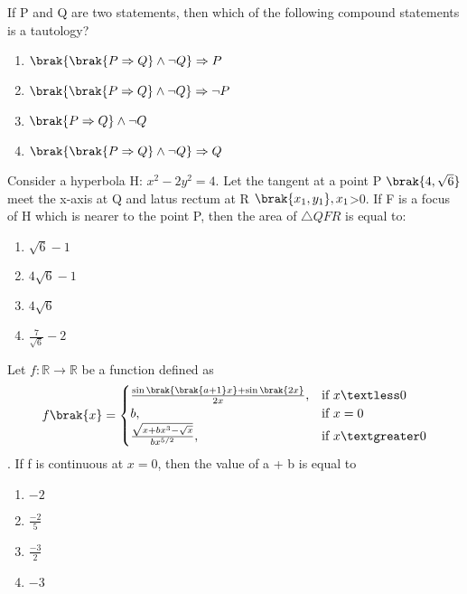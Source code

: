 \iffalse
\title{2021}
\author{AI24BTECH11006}
\section{mcq-single}
\fi
\item If P and Q are two statements, then which of the following compound statements is a tautology?
\hfill{}

	\begin{enumerate}
    
\item  $\brak{\brak{P \Rightarrow Q} \land \neg Q} \Rightarrow P$ 
\item   $\brak{\brak{P \Rightarrow Q} \land \neg Q} \Rightarrow \neg P $
\item $ \brak{P \Rightarrow Q} \land \neg Q$ 
\item  $\brak{\brak{P \Rightarrow Q} \land \neg Q} \Rightarrow Q $


\end{enumerate}
\item  Consider a hyperbola H: $x^2 -2y^2=4$. Let the tangent at a point P $\brak{4,\sqrt{6}}$ meet the x-axis at Q and latus rectum at R $\brak{x_1,y_1} , x_1 $\textgreater 0. If F is a focus of H which is nearer to the point P, then the area of $\triangle{QFR}$ is equal to:
\hfill{}
	\begin{enumerate}
\item $\sqrt{6} - 1$
\item  $4\sqrt{6} - 1$
\item  $4\sqrt{6} $
\item $\frac{7}{\sqrt{6}} - 2 $


\end{enumerate}
\item Let $f : \mathbb{R} \to \mathbb{R}$ be a function defined as 
\begin{equation}
	f\brak{x} = 
\begin{cases} 
\frac{\sin\brak{\brak{a+1}x} + \sin\brak{2x}}{2x}, & $if $  x \textless 0 \\ 
b, & $if $ x = 0 \\ 
\frac{\sqrt{x + bx^{3} - \sqrt{x}}}{bx^{5/2}}, & $if $ x \textgreater 0 
\end{cases}
\end{equation}
. If f is continuous at $ x = 0$, then the value of a + b is equal to
\hfill{}
		\begin{enumerate}
    \item $-2$
    \item $\frac{-2}{5}$
    \item $\frac{-3}{2}$
    \item $-3$
\end{enumerate}
